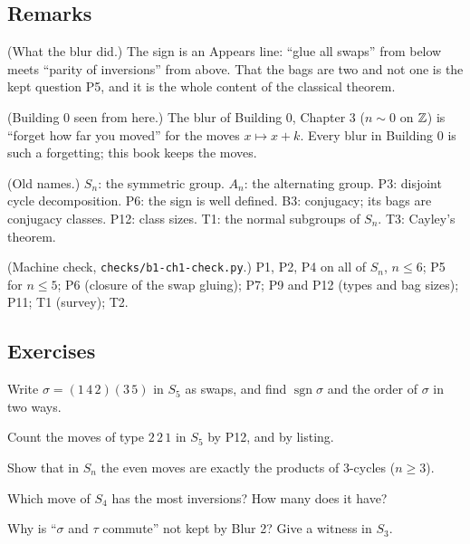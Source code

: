 \subsection*{Remarks}

\begin{lines}
\item[\lab{R1}] (What the blur did.) The sign is an Appears line: ``glue all swaps'' from below meets ``parity of inversions'' from above. That the bags are two and not one is the kept question P5, and it is the whole content of the classical theorem.
\item[\lab{R2}] (Building 0 seen from here.) The blur of Building 0, Chapter 3 ($n \sim 0$ on $\mathbb{Z}$) is ``forget how far you moved'' for the moves $x \mapsto x + k$. Every blur in Building 0 is such a forgetting; this book keeps the moves.
\item[\lab{R3}] (Old names.) $S_n$: the symmetric group. $A_n$: the alternating group. P3: disjoint cycle decomposition. P6: the sign is well defined. B3: conjugacy; its bags are conjugacy classes. P12: class sizes. T1: the normal subgroups of $S_n$. T3: Cayley's theorem.
\item[\lab{R4}] (Machine check, \texttt{checks/b1-ch1-check.py}.) P1, P2, P4 on all of $S_n$, $n \le 6$; P5 for $n \le 5$; P6 (closure of the swap gluing); P7; P9 and P12 (types and bag sizes); P11; T1 (survey); T2.
\end{lines}

\subsection*{Exercises}

\begin{lines}
\item[\lab{E1}] Write $\sigma = (1\,4\,2)(3\,5)$ in $S_5$ as swaps, and find $\operatorname{sgn}\sigma$ and the order of $\sigma$ in two ways.
\item[\lab{E2}] Count the moves of type $2\,2\,1$ in $S_5$ by P12, and by listing.
\item[\lab{E3}] Show that in $S_n$ the even moves are exactly the products of 3-cycles ($n \ge 3$).
\item[\lab{E4}] Which move of $S_4$ has the most inversions? How many does it have?
\item[\lab{E5}] Why is ``$\sigma$ and $\tau$ commute'' not kept by Blur 2? Give a witness in $S_3$.
\end{lines}

\newpage

